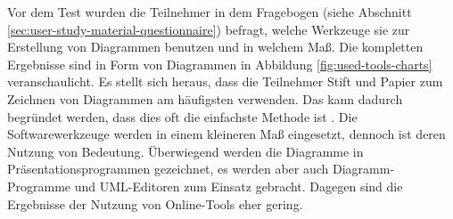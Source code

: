 Vor dem Test wurden die Teilnehmer in dem Fragebogen (siehe Abschnitt \ref{sec:user-study-material-questionnaire}) befragt, welche Werkzeuge sie zur Erstellung von Diagrammen benutzen und in welchem Maß. Die kompletten Ergebnisse sind in Form von Diagrammen in Abbildung \ref{fig:used-tools-charts} veranschaulicht. Es stellt sich heraus, dass die Teilnehmer Stift und Papier zum Zeichnen von Diagrammen am häufigsten verwenden. Das kann dadurch begründet werden, dass dies oft die einfachste Methode ist \cite{Ambler02Agile}. Die Softwarewerkzeuge werden in einem kleineren Maß eingesetzt, dennoch ist deren Nutzung von Bedeutung. Überwiegend werden die Diagramme in Präsentationsprogrammen gezeichnet, es werden aber auch Diagramm-Programme und UML-Editoren zum Einsatz gebracht. Dagegen sind die Ergebnisse der Nutzung von Online-Tools eher gering. 

